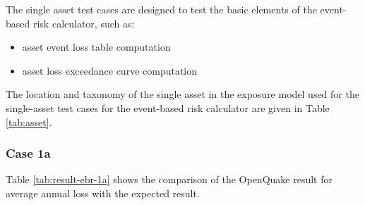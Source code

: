 The single asset test cases are designed to test the basic elements of the event-based risk calculator, such as:

\begin{itemize}
\item asset event loss table computation
\item asset loss exceedance curve computation
\end{itemize}

The location and taxonomy of the single asset in the exposure model used for the single-asset test cases for the event-based risk calculator are given in Table \ref{tab:asset}.

\subsubsection{Case 1a}


Table \ref{tab:result-ebr-1a} shows the comparison of the OpenQuake result for average annual loss with the expected result.
